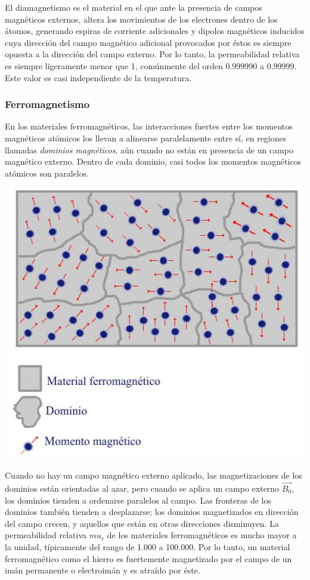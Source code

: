 \documentclass[a4paper,12pt]{article}
\newenvironment{Figure}
    {\par\medskip\noindent\minipage{\linewidth}}
    {\endminipage\par\medskip}
\begin{document}
        El diamagnetismo es el material en el que ante la presencia de campos magnéticos externos, altera los movimientos de los electrones dentro de los átomos, generando espiras de corriente adicionales y dipolos magnéticos inducidos cuya dirección del campo magnético adicional provocados por éstos es siempre opuesta a la dirección del campo externo. Por lo tanto, la permeabilidad relativa es siempre ligeramente menor que 1, comúnmente del orden 0.999990 a 0.99999. Este valor es casi independiente de la temperatura.

    \subsubsection*{Ferromagnetismo}

        En los materiales ferromagnéticos, las interacciones fuertes entre los momentos magnéticos atómicos los llevan a alinearse paralelamente entre sí, en regiones llamadas \emph{dominios magnéticos}, aún cuando no están en presencia de un campo magnético externo. Dentro de cada dominio, casi todos los momentos magnéticos atómicos son paralelos.

        \begin{Figure}
            \centering
            \includegraphics[width=0.4\linewidth]{ferromagnetismo_dominios.jpg}
            \label{fig: ferromagnetismo_dominios}
        \end{Figure}

        Cuando no hay un campo magnético externo aplicado, las magnetizaciones de los dominios están orientadas al azar, pero cuando se aplica un campo externo $\vec{B_0}$, los dominios tienden a ordenarse paralelos al campo. Las fronteras de los dominios también tienden a desplazarse; los dominios magnetizados en dirección del campo crecen, y aquellos que están en otras direcciones disminuyen. La permeabilidad relativa $mu_r$ de los materiales ferromagnéticos es mucho mayor a la unidad, típicamente del rango de 1.000 a 100.000. Por lo tanto, un material ferromagnético como el hierro es fuertemente magnetizado por el campo de un imán permanente o electroimán y es atraído por éste.
        
\end{document}
